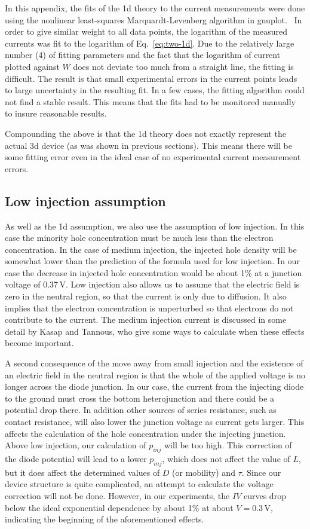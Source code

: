 In this appendix, the fits of the 1d theory to the current measurements
were done using the nonlinear least-squares Marquardt-Levenberg
 algorithm in gnuplot.~\cite{gnuplot}
In order to give similar weight to all data points, the logarithm
of the measured currents was fit to the logarithm of Eq.~\ref{eq:two-1d}.
Due to the relatively large number (4) of fitting parameters and the fact
that the logarithm of current plotted against $W$ does not deviate too 
much from a straight line, the fitting is difficult.
The result is that small experimental errors in the current points
leads to large uncertainty in the resulting fit.
In a few cases, the fitting algorithm could not find a stable result.
This means that the fits had to be monitored manually to insure
reasonable results.

Compounding the above is that the 1d theory does not exactly represent
the actual 3d device (as was shown in previous sections).
This means there will be some fitting error even in the ideal case
of no experimental current measurement errors.


\subsection{Low injection assumption}

As well as the 1d assumption, we also use the assumption of low injection.
In this case the minority hole concentration must be much less than the
 electron concentration.
In the case of medium injection, the injected hole density will be somewhat
lower than the prediction of the formula used for low injection.\cite{cristea}
In our case the decrease in injected hole concentration would be about 1\%
at a junction voltage of 0.37\,V.
Low injection also allows us to assume that the electric field is zero
in the neutral region, so that the current
is only due to diffusion.  It also implies that the electron concentration
is unperturbed so that electrons do not contribute to the current.
The medium injection current is discussed in some detail by Kasap and Tannous,\cite{kasap}
who give some ways to calculate when these effects become important.

A second consequence of the move away from small injection and the existence
of an electric field in the neutral region is that the whole of the applied
voltage is no longer across the diode junction.
In our case, the current from the injecting diode to the ground must cross
the bottom heterojunction and there could be a potential drop there.
In addition other sources of series resistance, such as contact
resistance, will also lower the junction voltage as current gets
larger.
This affects the calculation of the hole concentration under the injecting
junction.  Above low injection, our calculation of $p_{inj}$ will be too
high.  This correction of the diode potential will lead to a lower $p_{inj}$,
which does not affect the value of $L$, but it does affect the
determined values of $D$ (or mobility) and $\tau$.
Since our device structure is quite complicated, an attempt to calculate 
the voltage correction will not be done.
However, in our experiments, the $IV$ curves drop below the ideal exponential
dependence by about 1\% at about $V=0.3$\,V,  indicating the beginning
of the aforementioned effects.

